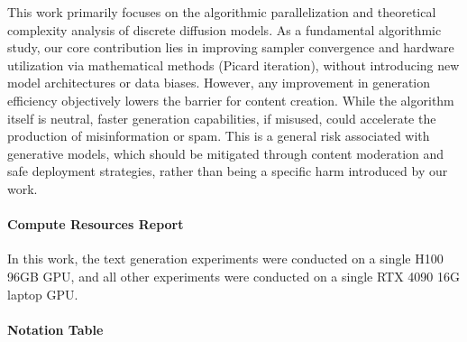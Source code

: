 \documentclass{article}
\begin{document}
This work primarily focuses on the algorithmic parallelization and theoretical complexity analysis of discrete diffusion models. As a fundamental algorithmic study, our core contribution lies in improving sampler convergence and hardware utilization via mathematical methods (Picard iteration), without introducing new model architectures or data biases. However, any improvement in generation efficiency objectively lowers the barrier for content creation. While the algorithm itself is neutral, faster generation capabilities, if misused, could accelerate the production of misinformation or spam. This is a general risk associated with generative models, which should be mitigated through content moderation and safe deployment strategies, rather than being a specific harm introduced by our work.

\paragraph{Compute Resources Report}

In this work, the text generation experiments were conducted on a single H100 96GB GPU, and all other experiments were conducted on a single RTX 4090 16G laptop GPU. 

\paragraph{Notation Table}
\end{document}
